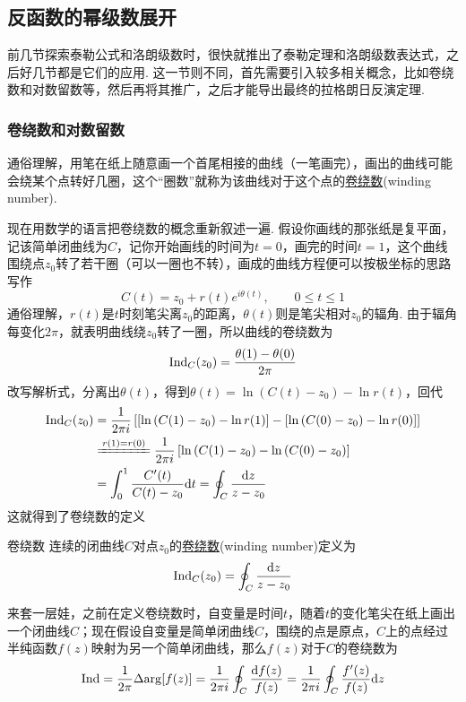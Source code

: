 \subsection{反函数的幂级数展开}

前几节探索泰勒公式和洛朗级数时，很快就推出了泰勒定理和洛朗级数表达式，之后好几节都是它们的应用. 这一节则不同，首先需要引入较多相关概念，比如卷绕数和对数留数等，然后再将其推广，之后才能导出最终的拉格朗日反演定理.

\subsubsection{卷绕数和对数留数}

通俗理解，用笔在纸上随意画一个首尾相接的曲线（一笔画完），画出的曲线可能会绕某个点转好几圈，这个“圈数”就称为该曲线对于这个点的\uline{卷绕数}(winding number).

现在用数学的语言把卷绕数的概念重新叙述一遍. 假设你画线的那张纸是复平面，记该简单闭曲线为\(C\)，记你开始画线的时间为\(t=0\)，画完的时间\(t=1\)，这个曲线围绕点\(z_0\)转了若干圈（可以一圈也不转），画成的曲线方程便可以按极坐标的思路写作
\[C(t) = z_0 + r(t)e^{i\theta(t)}, \qquad 0 \leq t \leq 1\]
通俗理解，\(r(t)\)是\(t\)时刻笔尖离\(z_0\)的距离，\(\theta(t)\)则是笔尖相对\(z_0\)的辐角. 由于辐角每变化\(2\pi\)，就表明曲线绕\(z_0\)转了一圈，所以曲线的卷绕数为
\[ {\rm Ind}_C(z_0) = \frac{\theta(1)-\theta(0)}{2\pi} \]
改写解析式，分离出\(\theta(t)\)，得到\(\theta(t) = \ln \left(C(t) - z_0\right) - \ln r(t)\)，回代
\begin{align*}
    \trm{Ind}_C(z_0) &= \frac{1}{2\pi i}\left[\left[\ln \left(C(1) - z_0\right) - \ln r(1)\right]-\left[\ln \left(C(0) - z_0\right) - \ln r(0)\right]\right] \\
    & \xlongequal[]{r(1)=r(0)} \frac{1}{2\pi i}\left[\ln \left(C(1) - z_0\right)-\ln \left(C(0) - z_0\right)\right] \\
    & = \int_{0}^{1} \frac{C'(t)}{C(t)-z_0} \trm{d}t = \oint_{C}\frac{\trm{d}z}{z-z_0}
\end{align*}
这就得到了卷绕数的定义
\begin{definition}{卷绕数}
    连续的闭曲线\(C\)对点\(z_0\)的\uline{卷绕数}(winding number)定义为
    \[{\rm Ind}_C(z_0) = \oint_{C}\frac{{\rm d}z}{z-z_0}\]
\end{definition}

来套一层娃，之前在定义卷绕数时，自变量是时间\(t\)，随着\(t\)的变化笔尖在纸上画出一个闭曲线\(C\)；现在假设自变量是简单闭曲线\(C\)，围绕的点是原点，\(C\)上的点经过半纯函数\(f(z)\)映射为另一个简单闭曲线，那么\(f(z)\)对于\(C\)的卷绕数为
\[{\rm Ind} = \frac{1}{2\pi}\Delta{\rm arg} [f(z)] = \frac{1}{2\pi i}\oint_{C}\frac{{\rm d}f(z)}{f(z)} = \frac{1}{2\pi i}\oint_{C}\frac{f'(z)}{f(z)}{\rm d}z\]

